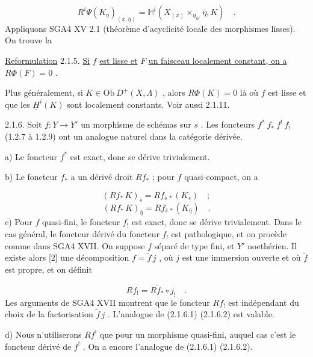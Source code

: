 \begin{equation*}
R^i\Psi(K_\eta)_{(\bar x,\bar\eta)} = \mathbb{H}^i(X_{(\bar x)} \times_{\eta_{nr}} \bar\eta, K) \quad .
\end{equation*}
Appliquons SGA4 XV 2.1 (théorème d'acyclicité locale des morphismes lisses). On trouve la

\underline{Reformulation} 2.1.5. \underline{Si} $f$ \underline{est lisse et} $F$ \underline{un faisceau localement constant, on a} $R\Phi(F) = 0$ .

Plus généralement, si $K \in \mathrm{Ob}\ D^+(X, \Lambda)$ , alors $R\Phi(K) = 0$ là où $f$ est lisse et que les $\underline{H}^i(K)$ sont localement constants. Voir aussi 2.1.11.

2.1.6. Soit $f : Y \longrightarrow Y'$ un morphisme de schémas sur $s$ . Les foncteurs $f^*\ f_*\ f^!\ f_!$ (1.2.7 à 1.2.9) ont un analogue naturel dans la catégorie dérivée.

a) Le foncteur $f^*$ est exact, donc se dérive trivialement.



b) Le foncteur $f_*$ a un dérivé droit $Rf_*$ ; pour $f$ quasi-compact, on a

\begin{equation}\tag{2.1.6.1}
(Rf_*\, K)_{\bar s} = Rf_{\bar s\,*}(K_{\bar s}) \quad ;
\end{equation}
\begin{equation}\tag{2.1.6.2}
(Rf_*\, K)_{\bar\eta} = Rf_{\bar s\,*}(K_{\bar\eta}) \quad .
\end{equation}
c) Pour $f$ quasi-fini, le foncteur $f_!$ est exact, donc se dérive trivialement. Dans le cas général, le foncteur dérivé du foncteur $f_!$ est pathologique, et on procède comme dans SGA4 XVII. On suppose $f$ séparé de type fini, et $Y'$ noethérien. Il existe alors [2] une décomposition $f = \widetilde{f}\, j$ , où $j$ est une immersion ouverte et où $\widetilde{f}$ est propre, et on définit

\begin{equation*}
Rf_! = R\widetilde{f}_* \circ j_! \quad .
\end{equation*}
Les arguments de SGA4 XVII montrent que le foncteur $Rf_!$ est indépendant du choix de la factorisation $\widetilde{f}\, j$ . L'analogue de (2.1.6.1) (2.1.6.2) est valable.

d) Nous n'utiliserons $Rf^!$ que pour un morphisme quasi-fini, auquel cas c'est le foncteur dérivé de $f^!$ . On a encore l'analogue de (2.1.6.1) (2.1.6.2).


